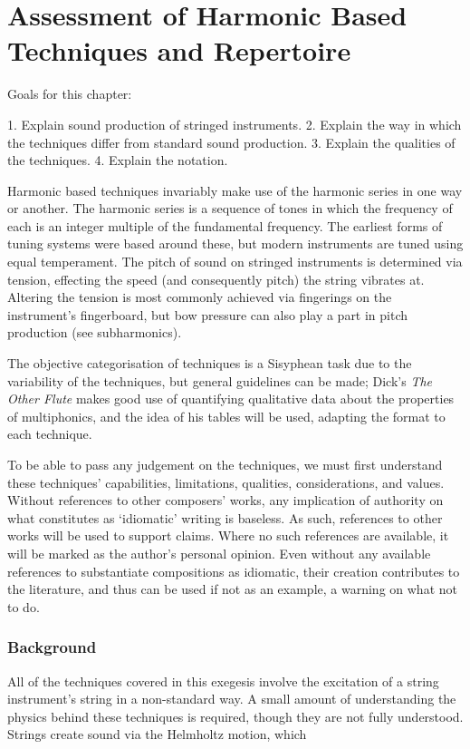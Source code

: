 
\chapter{Assessment of Harmonic Based Techniques and Repertoire}

Goals for this chapter:

1. Explain sound production of stringed instruments.
2. Explain the way in which the techniques differ from standard sound production.
3. Explain the qualities of the techniques.
4. Explain the notation.



Harmonic based techniques invariably make use of the harmonic series in one way or another. 
The harmonic series is a sequence of tones in which the frequency of each is an integer multiple of the fundamental frequency. 
The earliest forms of tuning systems were based around these, but modern instruments are tuned using equal temperament. 
The pitch of sound on stringed instruments is determined via tension, effecting the speed (and consequently pitch) the string vibrates at. 
Altering the tension is most commonly achieved via fingerings on the instrument's fingerboard, but bow pressure can also play a part in pitch production (see subharmonics).

The objective categorisation of techniques is a Sisyphean task due to the variability of the techniques, but general guidelines can be made; Dick's \emph{The Other Flute} makes good use of quantifying qualitative data about the properties of multiphonics, and the idea of his tables will be used, adapting the format to each technique.\autocite[84]{dickOtherFlute1989}

To be able to pass any judgement on the techniques, we must first understand these techniques' capabilities, limitations, qualities, considerations, and values. 
Without references to other composers' works, any implication of authority on what constitutes as `idiomatic' writing is baseless. 
As such, references to other works will be used to support claims. 
Where no such references are available, it will be marked as the author's personal opinion. 
Even without any available references to substantiate compositions as idiomatic, their creation contributes to the literature, and thus can be used if not as an example, a warning on what not to do. 

\subsection{Background}
All of the techniques covered in this exegesis involve the excitation of a string instrument's string in a non-standard way. 
A small amount of understanding the physics behind these techniques is required, though they are not fully understood.
Strings create sound via the Helmholtz motion, which 

